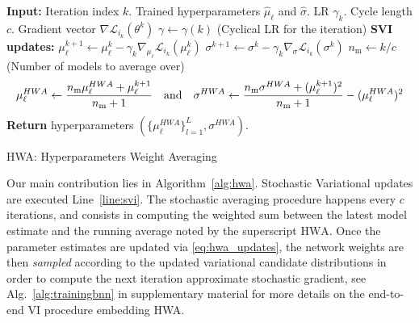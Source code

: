\documentclass[tablecaption=bottom,wcp]{jmlr}
\begin{document}
\begin{algorithm}[H]
\begin{algorithmic}[1]
\STATE \textbf{Input:} Iteration index $k$. Trained hyperparameters $\hat{\mu}_{\ell}$ and $\hat{\sigma}$. LR $\gamma_k$. Cycle length $c$. Gradient vector $\nabla \mathcal{L}_{i_{k}}(\theta^{k})$
\STATE $\gamma \leftarrow \gamma(k)$ (Cyclical LR for the iteration)
\STATE \textbf{SVI updates:}
\STATE \quad $\mu_{\ell}^{k+1} \leftarrow \mu_{\ell}^{k} - \gamma_k \nabla_{\mu_{\ell}} \mathcal{L}_{i_{k}}(\mu_{\ell}^{k})$  \label{line:svi}
\STATE \quad $\sigma^{k+1} \leftarrow \sigma^{k} - \gamma_k \nabla_{\sigma} \mathcal{L}_{i_{k}}(\sigma^{k})$ \label{line:svisigma}
	\STATE \quad $n_{\textrm{m}} \leftarrow k/c$ \quad (Number of models to average over)
\begin{equation}\notag
\mu_{\ell}^{HWA} \leftarrow \frac{n_{\textrm{m}}\mu_{\ell}^{HWA} + \mu_{\ell}^{k+1}}{n_{\textrm{m}}+1} \quad \textrm{and} \quad \sigma^{HWA} \leftarrow \frac{n_{\textrm{m}}\sigma^{HWA} + (\mu_{\ell}^{k+1})^2}{n_{\textrm{m}}+1} -( \mu_{\ell}^{HWA})^2
\end{equation}
\ENDIF
\STATE \textbf{Return} hyperparameters $(\{\mu_{\ell}^{HWA}\}_{l=1}^L, \sigma^{HWA})$.
\end{algorithmic}
\caption{HWA: Hyperparameters Weight Averaging}
\label{alg:hwa}
\end{algorithm}

Our main contribution lies in Algorithm~\ref{alg:hwa}.
Stochastic Variational updates are executed Line~\ref{line:svi}.
The stochastic averaging procedure happens every $c$ iterations, and consists in computing the weighted sum between the latest model estimate and the running average noted by the superscript $\textrm{HWA}$.
Once the parameter estimates are updated via \eqref{eq:hwa_updates}, the network weights are then \emph{sampled} according to the updated variational candidate distributions in order to compute the next iteration approximate stochastic gradient, see Alg.~\ref{alg:trainingbnn} in supplementary material for more details on the end-to-end VI procedure embedding HWA.
\end{document}
